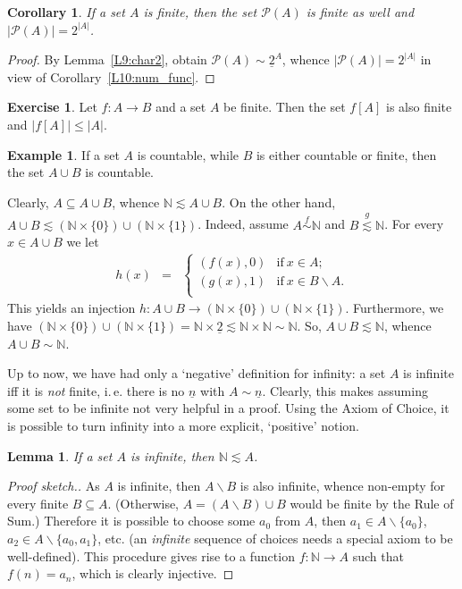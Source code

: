 \documentclass[12pt,notitlepage]{article}
\theoremstyle{plain}
\newtheorem{lemma}[thm]{Lemma}
\newtheorem{corr}[thm]{Corollary}
\theoremstyle{definition}
\newtheorem{exc}[thm]{Exercise}
\newtheorem{exm}[thm]{Example}
\theoremstyle{plain}
\newcommand{\N}{\mathbb{N}}
\newcommand{\sbs}{\subseteq}
\renewcommand{\setminus}{\smallsetminus}
\newcommand{\mP}{\mathcal{P}}
\newcommand{\ul}[1]{\underline{#1}}
\newcommand{\1}{\mathbf{1}}
\newcommand{\0}{\mathbf{0}}
\begin{document}
\begin{corr}\label{L10:num_pow}
If a set $A$ is finite, then the set $\mP(A)$ is finite as well and $|\mP(A)| = 2^{|A|}$.
\end{corr}
\begin{proof}
By Lemma~\ref{L9:char2}, obtain $\mP(A) \sim \ul{2}^A$, whence $|\mP(A)| = 2^{|A|}$ in view of Corollary~\ref{L10:num_func}.
\end{proof}

\begin{exc}\label{L10:fin_img}
Let $f\colon A \to B$ and a set $A$ be finite. Then the set $f[A]$ is also finite and $|f[A]| \leq |A|$.
\end{exc}

\begin{exm}\label{L10:2_union}
If a set $A$ is countable, while $B$ is either countable or finite, then the set $A \cup B$ is countable.

Clearly, $A \sbs A \cup B$, whence $\N \lesssim A \cup B$. On the other hand, $A \cup B \lesssim (\N \times \{ 0 \}) \cup (\N \times \{ 1 \})$. Indeed, assume $A \stackrel{f}{\sim} \N$ and $B \stackrel{g}{\lesssim} \N$. For every $x \in A \cup B$ we let
$$
\begin{array}{rcll}
h(x) &=&\begin{cases}
		(f(x),0)& \mbox{if}\ x \in A;\\
		(g(x),1)& \mbox{if}\ x \in B \setminus A.\\
		\end{cases}
\end{array}
$$
This yields an injection $h\colon A \cup B \to (\N \times \{ 0 \}) \cup (\N \times \{ 1 \})$. Furthermore, we have $(\N \times \{ 0 \}) \cup (\N \times \{ 1 \}) = \N \times \ul{2} \lesssim \N \times \N \sim \N$. So, $A \cup B \lesssim \N$, whence $A \cup B \sim \N$.
\end{exm}
\medskip

Up to now, we have had only a `negative' definition for infinity: a set $A$ is infinite iff it is \emph{not} finite, i.\,e. there is no $\ul{n}$ with $A \sim \ul{n}$. Clearly, this makes assuming some set to be infinite not very helpful in a proof. Using the Axiom of Choice, it is possible to turn infinity into a more explicit, `positive' notion.

\begin{lemma}\label{L10:min_inf}
If a set $A$ is infinite, then $\N \lesssim A$.
\end{lemma}
\begin{proof}[Proof sketch.]
As $A$ is infinite, then $A \setminus B$ is also infinite, whence non-empty for every finite $B \sbs A$. (Otherwise, $A = (A \setminus B) \cup B$ would be finite by the Rule of Sum.) Therefore it is possible to choose some $a_0$ from $A$, then $a_1 \in A \setminus \{ a_0 \}$, $a_2 \in A \setminus \{ a_0, a_1 \}$, etc. (an \emph{infinite} sequence of choices needs a special axiom to be well-defined). This procedure gives rise to a function $f\colon \N\to A$ such that $f(n) = a_n$, which is clearly injective.

\end{proof}
\end{document}
